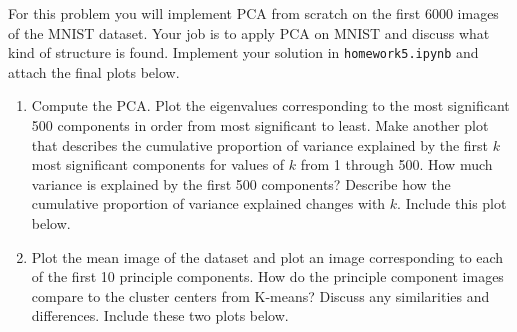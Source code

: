 \documentclass[submit]{../harvardml}
\begin{document}
\begin{problem}[PCA, 15 pts]
  


  For this problem you will implement PCA from scratch on the first 6000 images of the MNIST dataset. Your job is to apply PCA on MNIST and discuss what kind of structure is found. Implement your solution in \texttt{homework5.ipynb} and attach the final plots below. \\

  \begin{enumerate}

    \item Compute the PCA. Plot the eigenvalues corresponding to the most
    significant 500 components in order from most significant to
    least. Make another plot that describes the cumulative proportion of
    variance explained by the first $k$ most significant components for
    values of $k$ from 1 through 500.  How much variance is explained by
    the first 500 components?  Describe how the cumulative proportion of
    variance explained changes with $k$.  Include this plot below.

    \item Plot the mean image of the dataset and plot an image
    corresponding to each of the first 10 principle components.  How do
    the principle component images compare to the cluster centers from
    K-means? Discuss any similarities and differences.  Include these
    two plots below.
    

\end{enumerate}
\end{problem}
\end{document}
